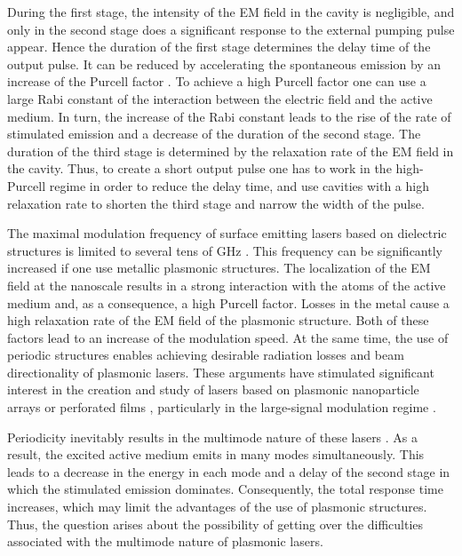 \documentclass[aps,prapplied,amsmath,amssymb,onecolumn,superscriptaddress,showpacs,floatfix,longbibliography]{revtex4-1}
\begin{document}
During the first stage, the intensity of the EM field in the cavity is negligible, and only in the second stage does a significant response to the external pumping pulse appear.
Hence the duration of the first stage determines the delay time of the output pulse.
It can be reduced by accelerating the spontaneous emission by an increase of the Purcell factor \cite{altug2006ultrafast, altug2008lpr}.
To achieve a high Purcell factor one can use a large Rabi constant of the interaction between the electric field and the active medium.
In turn, the increase of the Rabi constant leads to the rise of the rate of stimulated emission and a decrease of the duration of the second stage.
The duration of the third stage is determined by the relaxation rate of the EM field in the cavity.
Thus, to create a short output pulse one has to work in the high-Purcell regime in order to reduce the delay time, and use cavities with a high relaxation rate to shorten the third stage and narrow the width of the pulse.

The maximal modulation frequency of surface emitting lasers based on dielectric structures is limited to several tens of GHz \cite{coldren2012diode, scott1994high}.
This frequency can be significantly increased if one use metallic plasmonic structures.
The localization of the EM field at the nanoscale results in a strong interaction with the atoms of the active medium and, as a consequence, a high Purcell factor.
Losses in the metal cause a high relaxation rate of the EM field of the plasmonic structure.
Both of these factors lead to an increase of the modulation speed.
At the same time, the use of periodic structures enables achieving desirable radiation losses and beam directionality of plasmonic lasers.
These arguments have stimulated significant interest in the creation and study of lasers based on plasmonic nanoparticle arrays or perforated films \cite{BeijnumPRL,SchokkerPRB,ZhouNatNano,MengLPR}, particularly in the large-signal modulation regime \cite{daskalakis2018nanolett}.

Periodicity inevitably results in the multimode nature of these lasers \cite{BeijnumPRL,TennerJOpt}.
As a result, the excited active medium emits in many modes simultaneously.
This leads to a decrease in the energy in each mode and a delay of the second stage in which the stimulated emission dominates.
Consequently, the total response time increases, which may limit the advantages of the use of plasmonic structures.
Thus, the question arises about the possibility of getting over the difficulties associated with the multimode nature of plasmonic lasers.
\end{document}
